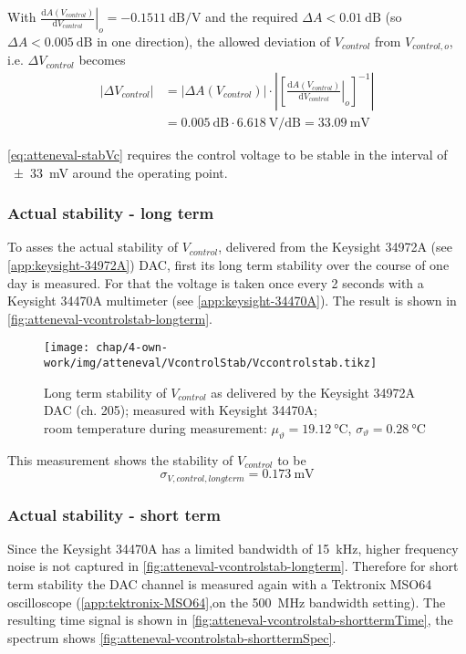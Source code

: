 With $\left.\frac{\text{d}A(V_{control})}{\text{d}V_{control}}\right|_{o} = \SI{-0.1511}{\dB\per\volt}$ and the required $\Delta A < \SI{0.01}{\dB}$ (so $\Delta A < \SI{0.005}{\dB}$ in one direction), the allowed deviation of $V_{control}$ from $V_{control,o}$, i.e. $\Delta V_{control}$ becomes
\begin{align}\label{eq:atteneval-stabVc}
\left|\Delta V_{control}\right| &= \left|\Delta A(V_{control})\right| \cdot 
\left|\left[\left.\frac{\text{d}A(V_{control})}{\text{d}V_{control}}\right|_{o}\right]^{-1}\right| \\
 &= \SI{0.005}{\dB} \cdot \SI{6.618}{\volt\per\dB} = \SI{33.09}{\milli\volt}
\end{align}

\autoref{eq:atteneval-stabVc} requires the control voltage to be stable in the interval of \SI{\pm33}{\mV} around the operating point.

\FloatBarrier
\subsubsection{Actual stability - long term}
To asses the actual stability of $V_{control}$, delivered from the Keysight 34972A (see \autoref{app:keysight-34972A}) DAC, first its long term stability over the course of one day is measured. For that the voltage is taken once every 2 seconds with a Keysight 34470A multimeter (see \autoref{app:keysight-34470A}). The result is shown in \autoref{fig:atteneval-vcontrolstab-longterm}.

\begin{figure}[tb]
	\centering
	\texttt{[image: chap/4-own-work/img/atteneval/VcontrolStab/Vccontrolstab.tikz]}
	\caption{Long term stability of $V_{control}$ as delivered by the Keysight 34972A DAC (ch. 205); measured with Keysight 34470A;\\room temperature during measurement: $\mu_\vartheta=\SI{19.12}{\degreeCelsius}$, $\sigma_\vartheta=\SI{0.28}{\degreeCelsius}$}
	\label{fig:atteneval-vcontrolstab-longterm}
\end{figure}

This measurement shows the stability of $V_{control}$ to be
\begin{equation}
\sigma_{V,control,longterm} = \SI{0.173}{\milli\volt}
\end{equation}

\FloatBarrier
\subsubsection{Actual stability - short term}\label{sec:atteneval-VcStabST}
Since the Keysight 34470A has a limited bandwidth of \SI{15}{\kHz}, higher frequency noise is not captured in \autoref{fig:atteneval-vcontrolstab-longterm}. Therefore for short term stability the DAC channel is measured again with a Tektronix MSO64 oscilloscope (\autoref{app:tektronix-MSO64},on the \SI{500}{\MHz} bandwidth setting). The resulting time signal is shown in \autoref{fig:atteneval-vcontrolstab-shorttermTime}, the spectrum shows \autoref{fig:atteneval-vcontrolstab-shorttermSpec}.

